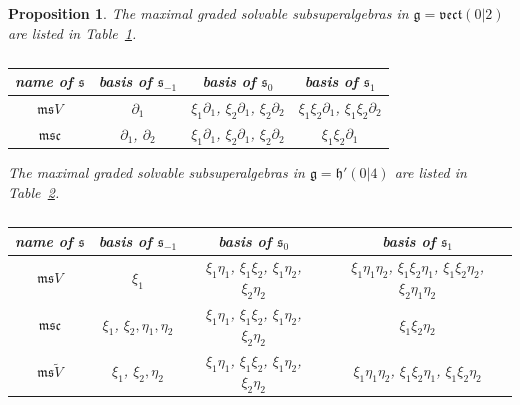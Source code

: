 \documentclass[10pt,a4paper]{amsart}
\newcommand {\fc} {{\mathfrak{c}}}
\newcommand {\fg} {{\mathfrak{g}}} %
\newcommand {\fh} {{\mathfrak{h}}}
\newcommand {\fm} {{\mathfrak{m}}}
\newcommand {\fs} {{\mathfrak{s}}}
\newcommand {\fvect} {{\mathfrak{vect}}} %
\newcommand {\<} [2] {{\left.\vphantom{#2}\right.^{#1\!}\!{#2}}}
\numberwithin{equation}{section}
\newtheorem{Proposition}[Theorem]{Proposition}
\begin{document}
\begin{Proposition}\label{P5} The maximal graded solvable subsuperalgebras in $\fg=\fvect(0|2)$ are listed in Table~{\rm \ref{vect02}}.
\begin{table}[h]\centering \renewcommand{\arraystretch}{1.2}
\begin{tabular}{|c|c|c|c|}
\hline
name of $\fs$ & basis of $\fs_{-1}$ & basis of $\fs_0$ & basis of $\fs_1$\\
\hline
$\fm\fs V$ & $\partial_1 $ & $\xi_1\partial_1$, $\xi_2\partial_1$, $\xi_2\partial_2$ & $\xi_1\xi_2\partial_1$, $\xi_1\xi_2\partial_2$ \\
\hline
$\fm\fs\fc$ & $\partial_1$, $\partial_2 $ & $\xi_1\partial_1$, $\xi_2\partial_1$, $\xi_2\partial_2$ & $\xi_1\xi_2\partial_1$ \\
\hline
\end{tabular}
\caption{}\label{vect02}
\end{table}

The maximal graded solvable subsuperalgebras in $\fg=\fh'(0|4)$ are listed in Table~{\rm \ref{h04}}.
\begin{table}[h]\centering \renewcommand{\arraystretch}{1.2}
\begin{tabular}{|c|c|c|c|}
\hline
name of $\fs$ & basis of $\fs_{-1}$ & basis of $\fs_0$ & basis of $\fs_1$\\
\hline
$\fm\fs V$ & $\xi_1 $ & $\xi_1\eta_1$, $\xi_1\xi_2$, $\xi_1\eta_2$, $\xi_2\eta_2$ & $\xi_1\eta_1\eta_2$, $\xi_1\xi_2\eta_1$, $\xi_1\xi_2\eta_2$, $\xi_2\eta_1\eta_2$ \\
\hline
$\fm\fs\fc$ & $\xi_1$, $\xi_2,\eta_1,\eta_2 $ & $\xi_1\eta_1$, $\xi_1\xi_2$, $\xi_1\eta_2$, $\xi_2\eta_2$ & $\xi_1\xi_2\eta_2$ \\
\hline
$\fm\fs\widetilde V$ & $\xi_1$, $\xi_2,\eta_2 $ & $\xi_1\eta_1$, $\xi_1\xi_2$, $\xi_1\eta_2$, $\xi_2\eta_2$ & $\xi_1\eta_1\eta_2$, $\xi_1\xi_2\eta_1$, $\xi_1\xi_2\eta_2$ \\
\hline
\end{tabular}
\caption{}\label{h04}
\end{table}
\end{Proposition}
\end{document}
